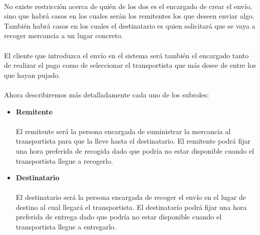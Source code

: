 \documentclass[10pt, a4paper,spanish]{article}
\begin{document}
\begin{itemize}
				\paragraph{}
				No existe restricción acerca de quién de los dos es el encargado de crear el envío, sino que habrá casos en los cuales serán los remitentes los que deseen enviar algo. También habrá casos en los cuales el destinatario es quien solicitará que se vaya a recoger mercancia a un lugar concreto.

				\paragraph{}
				El cliente que introduzca el envío en el sistema será también el encargado tanto de realizar el pago como de seleccionar el transportista que más desee de entre los que hayan pujado.

				\paragraph{}
				Ahora describiremos más detalladamente cada uno de los subroles:

				\begin{itemize}

					\item{\textbf{Remitente}}
					\paragraph{}
					El remitente será la persona encargada de suministrar la mercancia al transportista para que la lleve hasta el destinatario. El remitente podrá fijar una hora preferida de recogida dado que podría no estar disponible cuando el transportista llegue a recogerlo.

					\item{\textbf{Destinatario}}
					\paragraph{}
					El destinatario será la persona encargada de recoger el envío en el lugar de destino al cual llegará el transportista. El destinatarío podrá fijar una hora preferida de entrega dado que podría no estar disponible cuando el transportista llegue a entregarlo.

				\end{itemize}





			\end{itemize}
\end{document}
